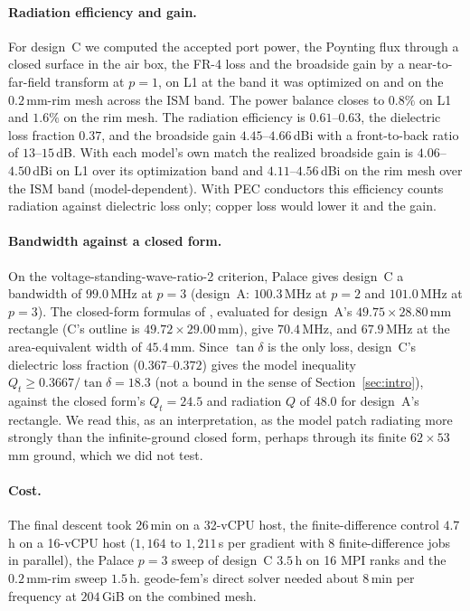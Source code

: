 \documentclass{anvil-paper}
\begin{document}
\paragraph{Radiation efficiency and gain.}
For design~C we computed the accepted port power, the Poynting flux through
a closed surface in the air box, the FR-4 loss and the broadside gain by a
near-to-far-field transform at $p = 1$, on L1 at the band it was optimized
on and on the $0.2$\,mm-rim mesh across the ISM band. The power balance
closes to $0.8\%$ on L1 and $1.6\%$ on the rim mesh. The radiation
efficiency is $0.61$--$0.63$, the dielectric loss fraction $0.37$, and the
broadside gain $4.45$--$4.66$\,dBi with a front-to-back ratio of
$13$--$15$\,dB. With each model's own match the realized broadside gain is
$4.06$--$4.50$\,dBi on L1 over its optimization band and $4.11$--$4.56$\,dBi
on the rim mesh over the ISM band (model-dependent). With PEC
conductors this efficiency counts radiation against dielectric loss only;
copper loss would lower it and the gain.

\paragraph{Bandwidth against a closed form.}
On the voltage-standing-wave-ratio-2 criterion, Palace gives design~C a
bandwidth of $99.0$\,MHz at $p = 3$ (design~A: $100.3$\,MHz at $p = 2$ and
$101.0$\,MHz at $p = 3$). The closed-form formulas of
\citet{jackson1991simple}, evaluated for design~A's $49.75\times28.80$\,mm
rectangle (C's outline is $49.72\times29.00$\,mm), give $70.4$\,MHz, and
$67.9$\,MHz at the area-equivalent width of $45.4$\,mm. Since $\tan\delta$ is
the only loss, design~C's dielectric loss fraction ($0.367$--$0.372$) gives the
model inequality $Q_t \ge 0.3667/\tan\delta = 18.3$ (not a bound in the sense of
Section~\ref{sec:intro}), against the closed form's $Q_t = 24.5$ and radiation
$Q$ of $48.0$ for design~A's rectangle. We read this, as an interpretation, as
the model patch radiating more strongly than the infinite-ground closed form,
perhaps through its finite $62\times53$\,mm ground, which we did not test.

\paragraph{Cost.}
The final descent took $26$\,min on a 32-vCPU host, the finite-difference
control $4.7$\,h on a 16-vCPU host ($1{,}164$ to $1{,}211$\,s per gradient with 8
finite-difference jobs in parallel), the Palace $p = 3$ sweep of design~C $3.5$\,h on 16 MPI ranks and
the $0.2$\,mm-rim sweep $1.5$\,h. geode-fem's direct solver needed about
$8$\,min per frequency at $204$\,GiB on the combined mesh.
\end{document}
